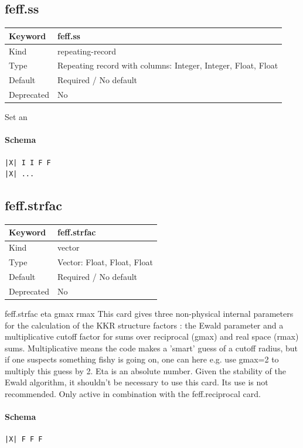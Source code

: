 \documentclass[11pt]{article}
\begin{document}
{{{{\subsection{feff.ss}
\label{kw:feff-ss}
\begin{longtable}{|p{1.5in}|p{4.5in}|}
\hline
Keyword & feff.ss \\
\hline
Kind & repeating-record \\
\hline
Type & Repeating record with columns: Integer, Integer, Float, Float \\
\hline
Default & Required / No default \\
\hline
Deprecated & No \\
\hline
\end{longtable}
 Set an

\paragraph{Schema}
\begin{Verbatim}
|X| I I F F
|X| ...
\end{Verbatim}

\subsection{feff.strfac}
\label{kw:feff-strfac}
\begin{longtable}{|p{1.5in}|p{4.5in}|}
\hline
Keyword & feff.strfac \\
\hline
Kind & vector \\
\hline
Type & Vector: Float, Float, Float \\
\hline
Default & Required / No default \\
\hline
Deprecated & No \\
\hline
\end{longtable}
 feff.strfac{ eta gmax rmax }
 This card gives three non-physical internal parameters for the calculation of the KKR structure
 factors : the Ewald parameter and a multiplicative cutoff factor for sums over reciprocal (gmax)
 and real space (rmax) sums. Multiplicative means the code makes a ’smart’ guess of a cutoff
 radius, but if one suspects something fishy is going on, one can here e.g. use gmax=2 to multiply
 this guess by 2. Eta is an absolute number. Given the stability of the Ewald algorithm, it
 shouldn’t be necessary to use this card. Its use is not recommended. Only active in combination
 with the feff.reciprocal card.

\paragraph{Schema}
\begin{Verbatim}
|X| F F F
\end{Verbatim}

}}}}
\end{document}
